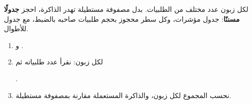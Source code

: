 \begin{statement}
لكل زبون عدد مختلف من الطلبيات. بدل مصفوفة مستطيلة تهدر الذاكرة، احجز \textbf{جدولًا مسننًا}: جدول مؤشرات، وكل سطر محجوز بحجم طلبيات صاحبه بالضبط، مع جدول للأطوال.
\end{statement}
\begin{stepsbox}\begin{enumerate}
\item \par{\centering\small{}\par} و .
\item لكل زبون: نقرأ عدد طلبياته ثم \par{\centering\small{}\par}.
\item نحسب المجموع لكل زبون، والذاكرة المستعملة مقارنة بمصفوفة مستطيلة.
\end{enumerate}\end{stepsbox}
